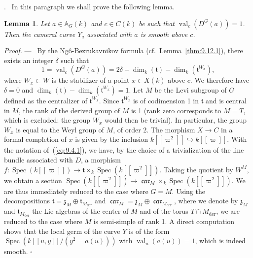 \documentclass[12pt,a4paper,oneside,english,leqno]{smfart}
\makeatletter
\numberwithin{equation}{subsection}
\newcounter{theo}
\numberwithin{theo}{subsection}
\newenvironment{paragr}[1][]{\medskip\refstepcounter{subsection}%
  \par\noindent\hspace*{\parindent}\thesubsection.\ \emph{#1}%
  \@ifundefined{@empty}{}{}\ignorespaces}{\medskip}
\theoremstyle{plain}
\newtheorem{lemma}[theo]{Lemma}
\theoremstyle{definition}
\theoremstyle{remark}
\newenvironment{preuve}[1][]{\medskip\noindent\textit{Proof.} #1 ---\ }%
  {\hfill\ensuremath{\square}\medskip}
\DeclareMathOperator{\der}{der}
\DeclareMathOperator{\val}{val}
\DeclareMathOperator{\Spec}{Spec}
\DeclareMathOperator{\car}{\mathfrak{car}}
\newcommand{\AAA}{\mathbb{A}}
\newcommand{\tgo}{\mathfrak{t}}
\newcommand{\zgo}{\mathfrak{z}}
\makeatother
\begin{document}
\begin{paragr}\label{S:9.14}
In this paragraph we shall prove the following lemma.

\begin{lemma}\label{thm:9.14.1}
Let $a\in\AAA_G(k)$ and $c\in C(k)$ be such that $\val_c(D^G(a))=1$. Then the cameral curve $Y_a$ associated with $a$ is smooth above $c$.
\end{lemma}

\begin{preuve}
By the Ng\^o-Bezrukavnikov formula (cf.\ Lemma~\ref{thm:9.12.1}), there exists an integer $\delta$ such that
$$1=\val_c(D^G(a))=2\delta+\dim_k(\tgo)-\dim_k(\tgo^{W_x}),$$
where $W_x\subset W$ is the stabilizer of a point $x\in X(k)$ above $c$. We therefore have $\delta=0$ and $\dim_k(\tgo)-\dim_k(\tgo^{W_x})=1$. Let $M$ be the Levi subgroup of $G$ defined as the centralizer of $\tgo^{W_x}$. Since $\tgo^{W_x}$ is of codimension 1 in $\tgo$ and is central in $M$, the rank of the derived group of $M$ is 1 (rank zero corresponds to $M=T$, which is excluded: the group $W_x$ would then be trivial). In particular, the group $W_x$ is equal to the Weyl group of $M$, of order 2. The morphism $X\to C$ in a formal completion of $x$ is given by the inclusion $k[[\varpi^2]]\hookrightarrow k[[\varpi]]$. With the notation of~(\ref{eq:9.4.1}), we have, by the choice of a trivialization of the line bundle associated with $D$, a morphism $f:\Spec(k[[\varpi]])\to\tgo\times_k\Spec(k[[\varpi^2]])$. Taking the quotient by $W^M$, we obtain a section $\Spec(k[[\varpi^2]])\to\car_M\times_k\Spec(k[[\varpi^2]])$. We are thus immediately reduced to the case where $G=M$. Using the decompositions $\tgo=\zgo_M\oplus\tgo_{M_{\der}}$ and $\car_M=\zgo_M\oplus\car_{M_{\der}}$, where we denote by $\zgo_M$ and $\tgo_{M_{\der}}$ the Lie algebras of the center of $M$ and of the torus $T\cap M_{\der}$, we are reduced to the case where $M$ is semi-simple of rank 1. A direct computation shows that the local germ of the curve $Y$ is of the form $\Spec(k[[u,y]]/(y^2=a(u)))$ with $\val_u(a(u))=1$, which is indeed smooth.
\end{preuve}
\end{paragr}
\end{document}
